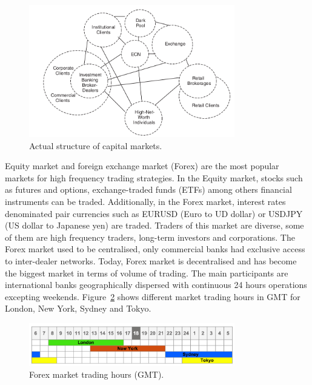 \begin{figure}[!h]
  \centering
  \includegraphics[width=0.8\textwidth]{img/capitalmarketsnow}
  \caption{Actual structure of capital markets.}
  \label{fig:capitalmarketnow}
\end{figure}


Equity market and foreign exchange market (Forex) are the most popular markets
for high frequency trading strategies. In the Equity market, stocks
such as futures and options, exchange-traded funds (ETFs) among others financial
instruments can be traded. Additionally, in the Forex market, interest rates denominated pair currencies 
such as EURUSD (Euro to UD dollar) or USDJPY (US dollar to Japanese yen) are traded. Traders of this market are diverse, some of them are
high frequency traders, long-term investors and corporations. The Forex market
used to be centralised, only commercial banks had exclusive access to
inter-dealer networks. Today, Forex market is decentralised and has become the
biggest market in terms of volume of trading. The main participants are
international banks geographically dispersed with continuous 24 hours operations
excepting weekends. Figure~\ref{fig:Forextimes} shows different market trading
hours in GMT for London, New York, Sydney and Tokyo.

\begin{figure}[!h]
  \centering
  \includegraphics[width=0.8\textwidth]{img/forex-trading-hours.png}
  \caption{Forex market trading hours (GMT).}
  \label{fig:Forextimes}
\end{figure}



